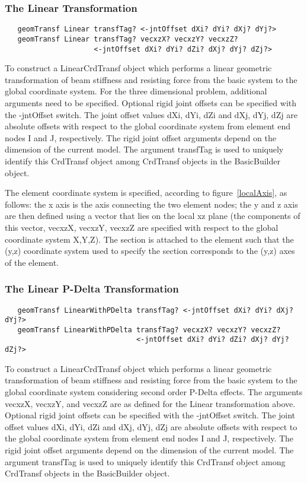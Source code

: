 \documentclass[12pt]{article}
\begin{document}
\subsubsection{The Linear Transformation}
{\sf\small
\begin{verbatim}
   geomTransf Linear transfTag? <-jntOffset dXi? dYi? dXj? dYj?>
   geomTransf Linear transfTag? vecxzX? vecxzY? vecxzZ?
                     <-jntOffset dXi? dYi? dZi? dXj? dYj? dZj?>
\end{verbatim}
}

To construct a LinearCrdTransf object which performs a linear geometric
transformation of beam stiffness and resisting force from the basic system
to the global coordinate system. For the three dimensional problem,
additional arguments need to be specified. Optional rigid joint
offsets can be specified with the -jntOffset switch. The joint offset
values dXi, dYi, dZi and dXj, dYj, dZj are absolute offsets with
respect to the global coordinate system from element end nodes I and
J, respectively. The rigid joint offset arguments depend on the
dimension of the current model. The argument transfTag is used to
uniquely identify this CrdTransf object among CrdTransf objects in the
BasicBuilder object. 

The element coordinate system is specified, according to
figure~\ref{localAxis}, as follows: the x axis is the axis connecting
the two element nodes; the y and z axis are then defined using a
vector that lies on the local xz plane (the components of this vector,
vecxzX, vecxzY, vecxzZ are specified with respect to the global
coordinate system X,Y,Z). The section is attached to the element such
that the (y,z) coordinate system used to specify the section
corresponds to the (y,z) axes of the element. 



\subsubsection{The Linear P-Delta Transformation}
{\sf\small
\begin{verbatim}
   geomTransf LinearWithPDelta transfTag? <-jntOffset dXi? dYi? dXj? dYj?>
   geomTransf LinearWithPDelta transfTag? vecxzX? vecxzY? vecxzZ? 
                               <-jntOffset dXi? dYi? dZi? dXj? dYj? dZj?>
\end{verbatim}
}

To construct a LinearCrdTransf object which performs a linear geometric
transformation of beam stiffness and resisting force from the basic system
to the global coordinate system considering second order P-Delta
effects. The arguments vecxzX, vecxzY, and vecxzZ are as defined for
the Linear transformation above. Optional rigid joint offsets can be
specified with the -jntOffset switch. The joint offset values dXi,
dYi, dZi and dXj, dYj, dZj are absolute offsets with respect to the
global coordinate system from element end  nodes I and J,
respectively. The rigid joint offset arguments depend on the dimension
of the current model. The argument transfTag is used to uniquely
identify this CrdTransf object among CrdTransf objects in the BasicBuilder object.
\end{document}

